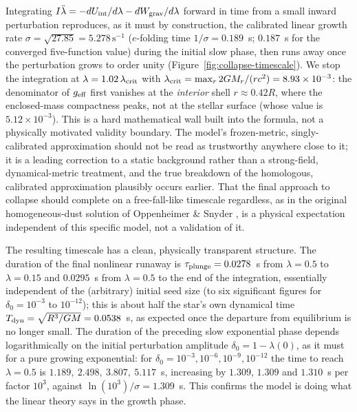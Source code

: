 \documentclass[11pt]{article}
\begin{document}
Integrating $I\ddot\lambda=-dU_{\rm int}/d\lambda-dW_{\rm grav}/d\lambda$ forward in time from a small inward perturbation reproduces, as it must by construction, the calibrated linear growth rate $\sigma=\sqrt{27.85}=5.278\,\mathrm{s}^{-1}$ ($e$-folding time $1/\sigma=0.189$~s; $0.187$~s for the converged five-function value) during the initial slow phase, then runs away once the perturbation grows to order unity (Figure~\ref{fig:collapse-timescale}). We stop the integration at $\lambda=1.02\,\lambda_{\rm crit}$ with $\lambda_{\rm crit}=\max_r2GM_r/(rc^2)=8.93\times10^{-3}$: the denominator of $g_{\rm eff}$ first vanishes at the \emph{interior} shell $r\approx0.42R$, where the enclosed-mass compactness peaks, not at the stellar surface (whose value is $5.12\times10^{-3}$). This is a hard mathematical wall built into the formula, not a physically motivated validity boundary. The model's frozen-metric, singly-calibrated approximation should not be read as trustworthy anywhere close to it; it is a leading correction to a static background rather than a strong-field, dynamical-metric treatment, and the true breakdown of the homologous, calibrated approximation plausibly occurs earlier. That the final approach to collapse should complete on a free-fall-like timescale regardless, as in the original homogeneous-dust solution of Oppenheimer \& Snyder \citep{OppenheimerSnyder1939}, is a physical expectation independent of this specific model, not a validation of it.

The resulting timescale has a clean, physically transparent structure. The duration of the final nonlinear runaway is $\tau_{\rm plunge}=0.0278$~s from $\lambda=0.5$ to $\lambda=0.15$ and $0.0295$~s from $\lambda=0.5$ to the end of the integration, essentially independent of the (arbitrary) initial seed size (to six significant figures for $\delta_0=10^{-3}$ to $10^{-12}$); this is about half the star's own dynamical time $T_{\rm dyn}=\sqrt{R^3/GM}=0.0538$~s, as expected once the departure from equilibrium is no longer small. The duration of the preceding slow exponential phase depends logarithmically on the initial perturbation amplitude $\delta_0=1-\lambda(0)$, as it must for a pure growing exponential: for $\delta_0=10^{-3},10^{-6},10^{-9},10^{-12}$ the time to reach $\lambda=0.5$ is $1.189,\ 2.498,\ 3.807,\ 5.117$~s, increasing by $1.309$, $1.309$ and $1.310$~s per factor $10^3$, against $\ln(10^3)/\sigma=1.309$~s. This confirms the model is doing what the linear theory says in the growth phase.
\end{document}
